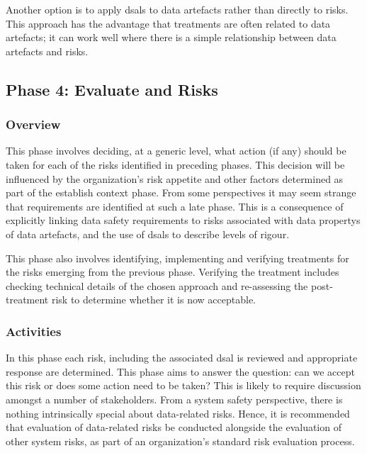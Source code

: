 Another option is to apply \glspl{dsal} to \glspl{data artefact} rather than directly to risks. This approach has the advantage that \glspl{treatment} are often related to \glspl{data artefact}; it can work well where there is a simple relationship between \glspl{data artefact} and risks.

\subsection{Phase 4: Evaluate and  Risks}
\subsubsection{Overview}
This phase involves deciding, at a generic level, what action (if any) should be taken for each of the risks identified in preceding phases. This decision will be influenced by the organization's risk appetite and other factors determined as part of the establish context phase. From some perspectives it may seem strange that requirements are identified at such a late phase. This is a consequence of explicitly linking data safety requirements to risks associated with \glspl{data property} of \glspl{data artefact}, and the use of \glspl{dsal} to describe levels of rigour. 

This phase also involves identifying, implementing and verifying \glspl{treatment} for the risks emerging from the previous phase. Verifying the \gls{treatment} includes checking technical details of the chosen approach and re-assessing the post-\gls{treatment} risk to determine whether it is now acceptable.

\subsubsection{Activities}
In this phase each risk, including the associated \gls{dsal} is reviewed and appropriate \gls{response} are determined. This phase aims to answer the question: can we accept this risk or does some action need to be taken? This is likely to require discussion amongst a number of \glspl{stakeholder}. From a system safety perspective, there is nothing intrinsically special about data-related risks. Hence, it is recommended that evaluation of data-related risks be conducted alongside the evaluation of other system risks, as part of an organization's standard risk evaluation process.

